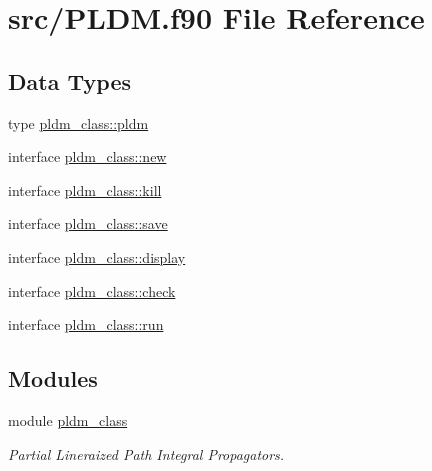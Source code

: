 \hypertarget{_p_l_d_m_8f90}{}\section{src/\+P\+L\+DM.f90 File Reference}
\label{_p_l_d_m_8f90}
\subsection*{Data Types}
\begin{DoxyCompactItemize}
\item 
type \hyperlink{structpldm__class_1_1pldm}{pldm\+\_\+class\+::pldm}
\item 
interface \hyperlink{interfacepldm__class_1_1new}{pldm\+\_\+class\+::new}
\item 
interface \hyperlink{interfacepldm__class_1_1kill}{pldm\+\_\+class\+::kill}
\item 
interface \hyperlink{interfacepldm__class_1_1save}{pldm\+\_\+class\+::save}
\item 
interface \hyperlink{interfacepldm__class_1_1display}{pldm\+\_\+class\+::display}
\item 
interface \hyperlink{interfacepldm__class_1_1check}{pldm\+\_\+class\+::check}
\item 
interface \hyperlink{interfacepldm__class_1_1run}{pldm\+\_\+class\+::run}
\end{DoxyCompactItemize}
\subsection*{Modules}
\begin{DoxyCompactItemize}
\item 
module \hyperlink{namespacepldm__class}{pldm\+\_\+class}
\begin{DoxyCompactList}\small\item\em Partial Lineraized Path Integral Propagators. \end{DoxyCompactList}\end{DoxyCompactItemize}
